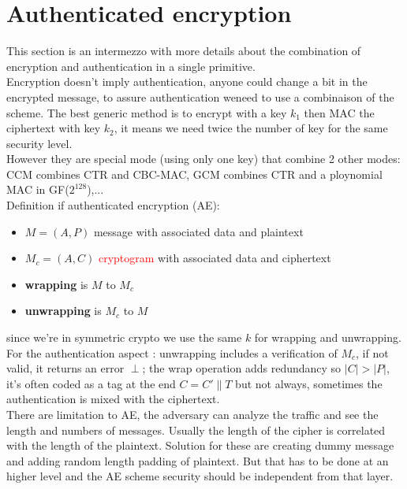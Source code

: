 \documentclass[11pt,a4paper]{report}
\begin{document}
\section{Authenticated encryption}
This section is an intermezzo with more details about the combination of encryption and authentication in a single primitive.\\

Encryption doesn't imply authentication, anyone could change a bit in the encrypted message, to assure authentication weneed to use a combinaison of the scheme. The best generic method is to encrypt with a key $k_1$ then MAC the ciphertext with key $k_2$, it means we need twice the number of key for the same security level.\\
However they are special mode (using only one key) that combine 2 other modes: CCM combines CTR and CBC-MAC, GCM combines CTR and a ploynomial MAC in GF($2^{128}$),...\\

Definition if authenticated encryption (AE):
\begin{itemize}
\item $M = (A,P)$ \textcolor{ao}{message} with associated data and plaintext
\item $M_c = (A,C)$ \textcolor{red}{cryptogram} with associated data and ciphertext
\item \textbf{wrapping} is $M$ to $M_c$
\item \textbf{unwrapping} is $M_c$ to $M$
\end{itemize}
since we're in symmetric crypto we use the same $k$ for wrapping and unwrapping.\\
For the authentication aspect : unwrapping includes a verification of $M_c$, if not valid, it returns an error $\perp$; the wrap operation adds redundancy so $|C| > |P|$, it's often coded as a tag at the end $C = C'\parallel T$ but not always, sometimes the authentication is mixed with the ciphertext.\\

There are limitation to AE, the adversary can analyze the traffic and see the length and numbers of messages. Usually the length of the cipher is correlated with the length of the plaintext. Solution for these are creating dummy message and adding random length padding of plaintext. But that has to be done at an higher level and the AE scheme security should be independent from that layer.\\
\end{document}
